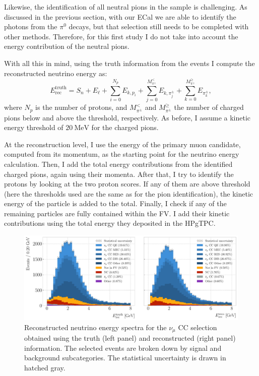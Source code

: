 Likewise, the identification of all neutral pions in the sample is challenging. As discussed in the previous section, with our ECal we are able to identify the photons from the $\pi^{0}$ decays, but that selection still needs to be completed with other methods. Therefore, for this first study I do not take into account the energy contribution of the neutral pions.

With all this in mind, using the truth information from the events I compute the reconstructed neutrino energy as:
\begin{equation}
    E^{\mathrm{truth}}_{\mathrm{rec}} = S_{n} + E_{\ell} + \sum_{i=0}^{N_{p}} E_{k,p_{i}} + \sum_{j=0}^{M_{\pi^{\pm}}^{<}} E_{k,\pi^{\pm}_{j}} + \sum_{k=0}^{M_{\pi^{\pm}}^{\geq}} E_{\pi^{\pm}_{k}},
\end{equation}
where $N_{p}$ is the number of protons, and $M_{\pi^{\pm}}^{<}$ and $M_{\pi^{\pm}}^{\geq}$ the number of charged pions below and above the threshold, respectively. As before, I assume a kinetic energy threshold of $20~\mathrm{MeV}$ for the charged pions.

At the reconstruction level, I use the energy of the primary muon candidate, computed from its momentum, as the starting point for the neutrino energy calculation. Then, I add the total energy contributions from the identified charged pions, again using their momenta. After that, I try to identify the protons by looking at the two proton scores. If any of them are above threshold (here the thresholds used are the same as for the pion identification), the kinetic energy of the particle is added to the total. Finally, I check if any of the remaining particles are fully contained within the FV. I add their kinetic contributions using the total energy they deposited in the HPgTPC.

\begin{figure}[t]
    \centering
    \includegraphics[width=.99\linewidth]{Images/GAr_selection/numuCC_selection_reco_energy_comparison.pdf}
    \caption[Reconstructed neutrino energy spectra for the $\nu_{\mu}$ CC selection obtained using the truth and reconstructed information]{Reconstructed neutrino energy spectra for the $\nu_{\mu}$ CC selection obtained using the truth (left panel) and reconstructed (right panel) information. The selected events are broken down by signal and background subcategories. The statistical uncertainty is drawn in hatched gray.}
    \label{fig:numuCC_reconstructed_energy}
\end{figure}


